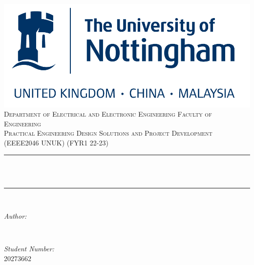 \begin{titlepage}
    \centering
    \includegraphics[scale = 0.4]{uon.png}\\[1.0 cm]	%

    
    \textsc{\Large Department of Electrical and Electronic Engineering
    Faculty of Engineering}\\[1.5 cm]	%
    \textsc{\large Practical Engineering Design Solutions and Project Development}\\[0.5 cm]				%
    \textsc{\large (EEEE2046 UNUK) (FYR1 22-23)}\\[0.5 cm]				%


    \rule{\linewidth}{0.2 mm} \\[0.4 cm]
    { \huge \bfseries \thetitle}\\
    \rule{\linewidth}{0.2 mm} \\[1.5 cm]

    \begin{minipage}{0.4\textwidth}
        \begin{flushleft} \large
            \emph{Author:}\\
            \theauthor
        \end{flushleft}
    \end{minipage}~
    \begin{minipage}{0.4\textwidth}
        \begin{flushright} \large
            \emph{Student Number:} \\
            20273662									%
        \end{flushright}
    \end{minipage}\\[1.5 cm]

    {\large \thedate}\\[0 cm]

    \vfill

\end{titlepage}